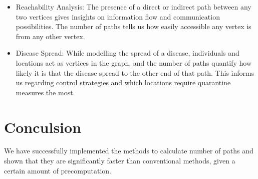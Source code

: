 \documentclass[12pt, a4paper]{article}
\begin{document}
\begin{flushleft}
\begin{itemize}
        \item Reachability Analysis: The presence of a direct or indirect path between any two vertices gives insights on information flow and communication possibilities. The number of paths tells us how easily accessible any vertex is from any other vertex.

        \item Disease Spread: While modelling the spread of a disease, individuals and locations act as vertices in the graph, and the number of paths quantify how likely it is that the disease spread to the other end of that path. This informs us regarding control strategies and which locations require quarantine measures the most.
      \end{itemize}

    \end{flushleft} 

    \section{Conculsion}
    \begin{flushleft}
      We have successfully implemented the methods to calculate number of paths and shown that they are significantly faster than conventional methods, given a certain amount of precomputation.
    \end{flushleft}
\end{document}
